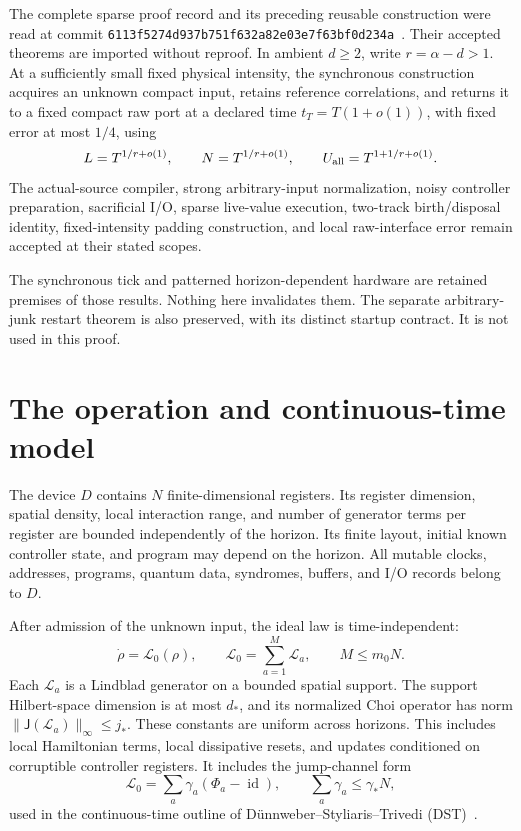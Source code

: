\documentclass[11pt]{article}
\newcommand{\id}{\operatorname{id}}
\newcommand{\Lz}{\mathcal L_0}
\newcommand{\J}{\mathsf J}
\begin{document}
The complete sparse proof record and its preceding reusable construction
were read at commit
\texttt{6113f5274d937b751f632a82e03e7f63bf0d234a}~\cite{Sparse,Reusable}.
Their accepted theorems are imported without reproof. In ambient \(d\geq2\),
write \(r=\alpha-d>1\). At a sufficiently small fixed physical intensity,
the synchronous construction acquires an unknown compact input, retains
reference correlations, and returns it to a fixed compact raw port at a
declared time \(t_T=T(1+o(1))\), with fixed error at most \(1/4\), using
\[
 L=T^{1/r+o(1)},\qquad
 N=T^{1/r+o(1)},\qquad
 U_{\rm all}=T^{1+1/r+o(1)}.
\]
The actual-source compiler, strong arbitrary-input normalization, noisy
controller preparation, sacrificial I/O, sparse live-value execution,
two-track birth/disposal identity, fixed-intensity padding construction,
and local raw-interface error remain accepted at their stated scopes.

The synchronous tick and patterned horizon-dependent hardware are retained
premises of those results. Nothing here invalidates them. The separate
arbitrary-junk restart theorem is also preserved, with its distinct
startup contract. It is not used in this proof.

\section{The operation and continuous-time model}

The device \(D\) contains \(N\) finite-dimensional registers. Its register
dimension, spatial density, local interaction range, and number of
generator terms per register are bounded independently of the horizon.
Its finite layout, initial known controller state, and program may depend
on the horizon. All mutable clocks, addresses, programs, quantum data,
syndromes, buffers, and I/O records belong to \(D\).

After admission of the unknown input, the ideal law is time-independent:
\[
 \dot\rho=\Lz(\rho),\qquad
 \Lz=\sum_{a=1}^{M}\mathcal L_a,\qquad M\leq m_0N.
 \tag{1}
\]
Each \(\mathcal L_a\) is a Lindblad generator on a bounded spatial support.
The support Hilbert-space dimension is at most \(d_*\), and its normalized
Choi operator has norm
\(\|\J(\mathcal L_a)\|_\infty\leq j_*\).
These constants are uniform across horizons. This includes local
Hamiltonian terms, local dissipative resets, and updates conditioned on
corruptible controller registers. It includes the jump-channel form
\[
 \Lz=\sum_a\gamma_a(\Phi_a-\id),\qquad
 \sum_a\gamma_a\leq\gamma_*N,
 \tag{2}
\]
used in the continuous-time outline of
D\"unnweber--Styliaris--Trivedi (DST)~\cite{DST}.
\end{document}
